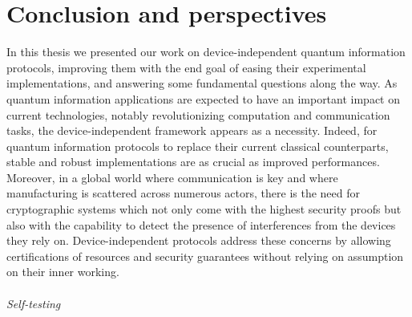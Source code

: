 \part{Conclusion and perspectives}
\label{part:conclusion}

In this thesis we presented our work on device-independent quantum information protocols, improving them with the end goal of easing their experimental implementations, and answering some fundamental questions along the way.
As quantum information applications are expected to have an important impact on current technologies, notably revolutionizing computation and communication tasks, the device-independent framework appears as a necessity.
Indeed, for quantum information protocols to replace their current classical counterparts, stable and robust implementations are as crucial as improved performances. 
Moreover, in a global world where communication is key and where manufacturing is scattered across numerous actors, there is the need for cryptographic systems which not only come with the highest security proofs but also with the capability to detect the presence of interferences from the devices they rely on.
Device-independent protocols address these concerns by allowing certifications of resources and security guarantees without relying on assumption on their inner working. 

%

\paragraph{Self-testing} 

